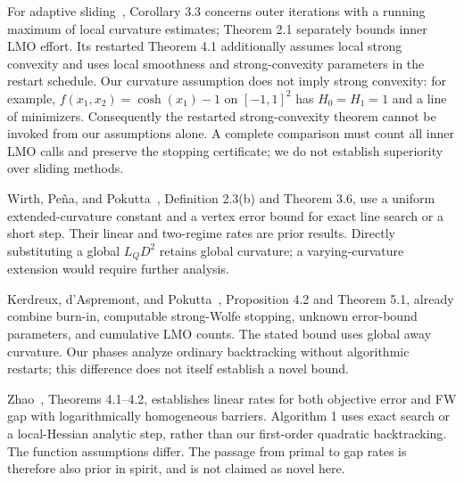 For adaptive sliding~\cite{adcgs}, Corollary 3.3 concerns outer
iterations with a running maximum of local curvature estimates;
Theorem 2.1 separately bounds inner LMO effort. Its restarted
Theorem 4.1 additionally assumes local strong convexity and uses local
smoothness and strong-convexity parameters in the restart schedule.
Our curvature assumption does not imply strong convexity: for example,
$f(x_1,x_2)=\cosh(x_1)-1$ on $[-1,1]^2$ has $H_0=H_1=1$ and a line
of minimizers. Consequently the restarted strong-convexity theorem
cannot be invoked from our assumptions alone. A complete comparison
must count all inner LMO calls and preserve the stopping certificate;
we do not establish superiority over sliding methods.

Wirth, Pe\~na, and Pokutta~\cite{wirth}, Definition 2.3(b) and
Theorem 3.6, use a uniform extended-curvature constant and a vertex
error bound for exact line search or a short step. Their linear
and two-regime rates are prior results. Directly substituting a
global $L_QD^2$ retains global curvature; a varying-curvature extension
would require further analysis.

Kerdreux, d'Aspremont, and Pokutta~\cite{restartfw}, Proposition 4.2
and Theorem 5.1, already combine burn-in, computable strong-Wolfe
stopping, unknown error-bound parameters, and cumulative LMO counts.
The stated bound uses global away curvature. Our phases analyze
ordinary backtracking without algorithmic restarts; this difference
does not itself establish a novel bound.

Zhao~\cite{zhao}, Theorems 4.1--4.2, establishes linear rates for both
objective error and FW gap with logarithmically homogeneous barriers.
Algorithm 1
uses exact search or a local-Hessian analytic step, rather than our
first-order quadratic backtracking. The function assumptions differ.
The passage from primal to gap rates is therefore also prior in
spirit, and is not claimed as novel here.
